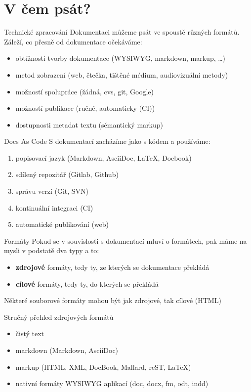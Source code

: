 \documentclass[12pt]{beamer}
\begin{document}
	\section{V čem psát?}

	\begin{frame}{Technické zpracování}
	Dokumentaci můžeme psát ve spoustě různých formátů. Záleží, co přesně od dokumentace očekáváme:
	\begin{itemize}
		\item obtížnosti tvorby dokumentace (WYSIWYG, markdown, markup, \ldots{})
		\item metod zobrazení (web, čtečka, tištěné médium, audiovizuální metody)
		\item možností spolupráce (žádná, cvs, git, Google)
		\item možností publikace (ručně, automaticky (CI))
		\item dostupnosti metadat textu (sémantický markup)
	\end{itemize}

	\end{frame}

	  \begin{frame}{Docs As Code}
S dokumentací zacházíme jako s kódem a používáme:
\begin{enumerate}
	\item popisovací jazyk (Markdown, AsciiDoc, \LaTeX, Docbook)
	\item sdílený repozitář (Gitlab, Github)
	\item správu verzí (Git, SVN)
	\item kontinuální integraci (CI)
	\item automatické publikování (web)
\end{enumerate}
\end{frame}


	\begin{frame}{Formáty}
	Pokud se v souvislosti s dokumentací mluví o formátech, pak máme na mysli v podstatě dva typy a to:
		\begin{itemize}
			\item \textbf{zdrojové} formáty, tedy ty, ze kterých se dokumentace překládá
			\item \textbf{cílové} formáty, tedy ty, do kterých se překládá
		\end{itemize}
	Některé souborové formáty mohou být jak zdrojové, tak cílové (HTML)
	\end{frame}

	\begin{frame}{Stručný přehled zdrojových formátů}
		\begin{itemize}
			\item čistý text
			\item markdown (Markdown, AsciiDoc)
			\item markup (HTML, XML, DocBook, Mallard, reST, \LaTeX)
			\item nativní formáty WYSIWYG aplikací (doc, docx, fm, odt, indd)
		\end{itemize}
	\end{frame}
\end{document}

